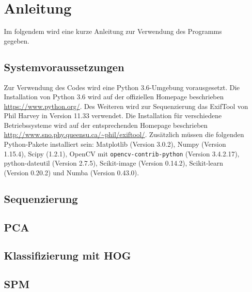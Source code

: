 \section*{Anleitung}
Im folgendem wird eine kurze Anleitung zur Verwendung des Programms gegeben.
\subsection*{Systemvoraussetzungen}
Zur Verwendung des Codes wird eine Python 3.6-Umgebung vorausgesetzt. Die Installation von Python 3.6 wird auf der offiziellen Homepage beschrieben \url{https://www.python.org/}. Des Weiteren wird zur Sequenzierung das ExifTool von Phil Harvey in Version 11.33 verwendet. Die Installation für verschiedene Betriebssysteme wird auf der entsprechenden Homepage beschrieben \url{http://www.sno.phy.queensu.ca/~phil/exiftool/}. Zusätzlich müssen die folgenden Python-Pakete installiert sein: Matplotlib (Version 3.0.2), Numpy (Version 1.15.4), Scipy (1.2.1),  OpenCV mit \texttt{opencv-contrib-python} (Version 3.4.2.17), python-dateutil (Version 2.7.5), Scikit-image (Version 0.14.2), Scikit-learn (Version 0.20.2) und Numba (Version 0.43.0).

\subsection*{Sequenzierung}
\subsection*{PCA}
\subsection*{Klassifizierung mit HOG}
\subsection*{SPM}




